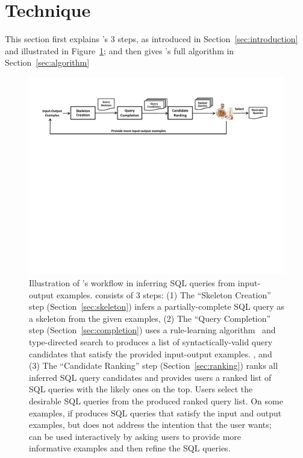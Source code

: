
\section{Technique}
\label{sec:approach}

This section first explains \ourtool's 3 steps, as introduced
in Section~\ref{sec:introduction} and illustrated
in Figure~\ref{fig:workflow}; and then gives \ourtool's full algorithm
in Section~\ref{sec:algorithm}


\begin{figure}[t]
  \centering
  \includegraphics[scale=0.70]{workflow}
  \vspace*{-1.0ex}\caption {{\label{fig:workflow} Illustration
  of \ourtool's workflow in inferring SQL queries from input-output examples. \ourtool consists of 3 steps: (1) The ``Skeleton Creation'' step (Section~\ref{sec:skeleton})
infers a partially-complete SQL query as a skeleton from the given
examples, (2) The ``Query Completion'' step (Section~\ref{sec:completion}) uses
a rule-learning algorithm~\cite{} and type-directed search to
produces a list of syntactically-valid query candidates that satisfy
the provided input-output examples.
, and (3) The ``Candidate Ranking'' step (Section~\ref{sec:ranking})
ranks all inferred SQL query candidates and provides users a
ranked list of SQL queries with the likely ones on the top. 
Users select the
desirable SQL queries from the produced ranked query list. On some
examples, if \ourtool produces SQL queries that satisfy the input and
output examples, but does not address the intention that the user wants;
\ourtool can be used interactively by asking users to provide more
informative examples and then refine the SQL queries.
}}

\end{figure}



